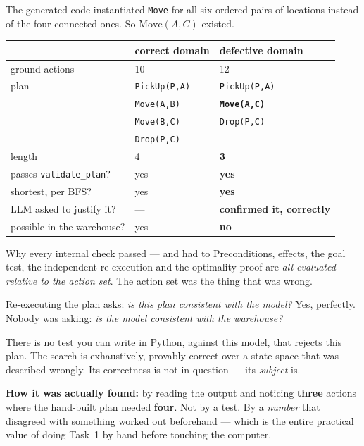 \documentclass[11pt,a4paper]{article}
\begin{document}
The generated code instantiated \texttt{Move} for all six ordered pairs of
locations instead of the four connected ones. So $\mathrm{Move}(A,C)$ existed.

\begin{center}
\small
\begin{tabular}{@{}lll@{}}
\toprule
& \textbf{correct domain} & \textbf{defective domain} \\
\midrule
ground actions            & 10 & 12 \\
plan                      & \texttt{PickUp(P,A)} & \texttt{PickUp(P,A)} \\
                          & \texttt{Move(A,B)}   & \textbf{\texttt{Move(A,C)}} \\
                          & \texttt{Move(B,C)}   & \texttt{Drop(P,C)} \\
                          & \texttt{Drop(P,C)}   & \\
length                    & 4 & \textbf{3} \\
passes \texttt{validate\_plan}? & yes & \textbf{yes} \\
shortest, per BFS?        & yes & \textbf{yes} \\
LLM asked to justify it?  & --- & \textbf{confirmed it, correctly} \\
possible in the warehouse? & yes & \textbf{no} \\
\bottomrule
\end{tabular}
\end{center}

\begin{warnbox}{Why every internal check passed --- and had to}
Preconditions, effects, the goal test, the independent re-execution and the
optimality proof are \emph{all evaluated relative to the action set}. The action
set was the thing that was wrong.

Re-executing the plan asks: \emph{is this plan consistent with the model?} Yes,
perfectly. Nobody was asking: \emph{is the model consistent with the
warehouse?}

There is no test you can write in Python, against this model, that rejects this
plan. The search is exhaustively, provably correct over a state space that was
described wrongly. Its correctness is not in question --- its \emph{subject} is.
\end{warnbox}

\textbf{How it was actually found:} by reading the output and noticing
\textbf{three} actions where the hand-built plan needed \textbf{four}. Not by a
test. By a \emph{number} that disagreed with something worked out beforehand ---
which is the entire practical value of doing Task~1 by hand before touching the
computer.
\end{document}
